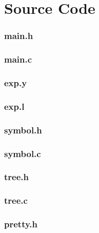 \documentclass[a4paper,10pt,titlepage]{report}
\begin{document}
\newpage

\appendix

\section{Source Code}

\subsubsection{main.h}



\subsubsection{main.c}


\subsubsection{exp.y}


\subsubsection{exp.l}


\subsubsection{symbol.h}


\subsubsection{symbol.c}


\subsubsection{tree.h}



\subsubsection{tree.c}


\subsubsection{pretty.h}

\end{document}
